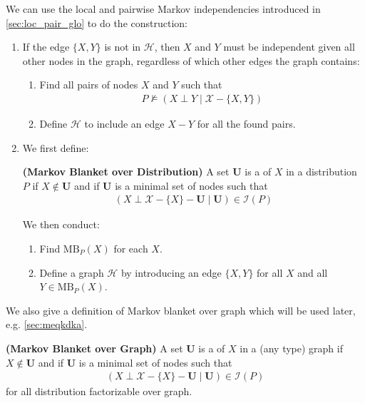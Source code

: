 \documentclass{article}
\newcommand{\bfs}[1]{\textbf{({#1}) }}
\begin{document}
We can use the local and pairwise Markov independencies introduced in \cref{sec:loc_pair_glo} to do the construction:
\begin{enumerate}
    \item {}  If the edge $\{X, Y\}$ is not in $\mathcal{H}$, then $X$ and $Y$ must be independent given all other nodes in the graph, regardless of which other edges the graph contains:
    \begin{enumerate}
        \item Find all pairs of nodes $X$ and $Y$ such that
\begin{align}
P \not \models(X \perp Y \mid \mathcal{X}-\{X, Y\})\label{eq:oiefcz}
\end{align}
\item Define $\mathcal{H}$ to include an edge $X-Y$ for all the found pairs.
    \end{enumerate}
    \item {}  We first define:
    \begin{defa}\bfs{Markov Blanket over Distribution}\label{eq:nefa}
    A set $\boldsymbol{U}$ is a  of $X$ in a distribution $P$ if $X \notin \boldsymbol{U}$ and if $\boldsymbol{U}$ is a minimal set of nodes such that
\begin{align}
(X \perp \mathcal{X}-\{X\}-\boldsymbol{U} \mid \boldsymbol{U}) \in \mathcal{I}(P)\label{eq:iierfz}
\end{align}
    \end{defa}
    We then conduct:
    \begin{enumerate}
    \item Find $\mathrm{MB}_{P}(X)$ for each $X$.
        \item Define a graph $\mathcal{H}$ by introducing an edge $\{X, Y\}$ for all $X$ and all $Y \in \mathrm{MB}_{P}(X)$.
    \end{enumerate}
\end{enumerate}
We also give a definition of Markov blanket over graph which will be used later, e.g. \cref{sec:meqkdka}.
\begin{defa}\bfs{Markov Blanket over Graph}\label{eq:zcdad}
    A set $\boldsymbol{U}$ is a  of $X$ in a (any type) graph if $X \notin \boldsymbol{U}$ and if $\boldsymbol{U}$ is a minimal set of nodes such that
\begin{align}
(X \perp \mathcal{X}-\{X\}-\boldsymbol{U} \mid \boldsymbol{U}) \in \mathcal{I}(P)\label{eq:zvdaff}
\end{align}
for all distribution factorizable over graph.
    \end{defa}
\end{document}
